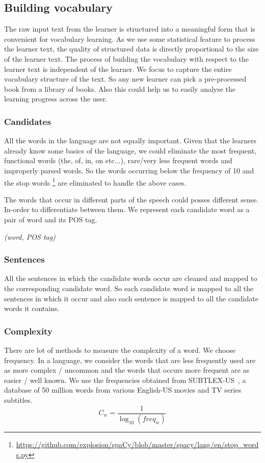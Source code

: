 \documentclass[11pt,a4paper]{article}
\begin{document}
\subsection{Building vocabulary}
The raw input text from the learner is structured into a meaningful form that is
convenient for vocabulary learning. As we use some statistical feature to
process the learner text, the quality of structured data is directly
proportional to the size of the learner text. The process of building the
vocabulary with respect to the learner text is independent of the learner. We focus
to capture the entire vocabulary structure of the text. So any new learner can
pick a pre-processed book from a library of books. Also this could help us to easily
analyse the learning progress across the user.

\subsubsection{Candidates}
All the words in the language are not equally important. Given that the learners
already know some basics of the language, we could eliminate the most frequent, 
functional words (the, of, in, on etc...), rare/very less frequent words and
improperly parsed words. So the words occurring below the frequency of 10 and
the stop words \footnote{\url{https://github.com/explosion/spaCy/blob/master/spacy/lang/en/stop_words.py}}
are eliminated to handle the above cases.

The words that occur in different parts of the speech could posses different sense.
In-order to differentiate between them. We represent each candidate word as a
pair of word and its POS tag.
\begin{center}\emph{(word, POS tag)}\end{center}

\subsubsection{Sentences}
All the sentences in which the candidate words occur are cleaned and mapped to
the corresponding candidate word. So each candidate word is mapped to all the sentences
in which it occur and also each sentence is mapped to all the candidate
words it contains.

\subsubsection{Complexity}
There are lot of methods to measure the complexity of a word. We choose frequency.
In a language, we consider the words that are less frequently used are as
more complex / uncommon and the words that occurs more frequent are as easier / well known.
We use the frequencies obtained from SUBTLEX-US~\citet{brysbaert2009moving}, a database of 50 million
words from various English-US movies and TV series subtitles.
\begin{equation}
  C_w = \frac{1}{\log_{10}(freq_w)}
\end{equation}
\end{document}
